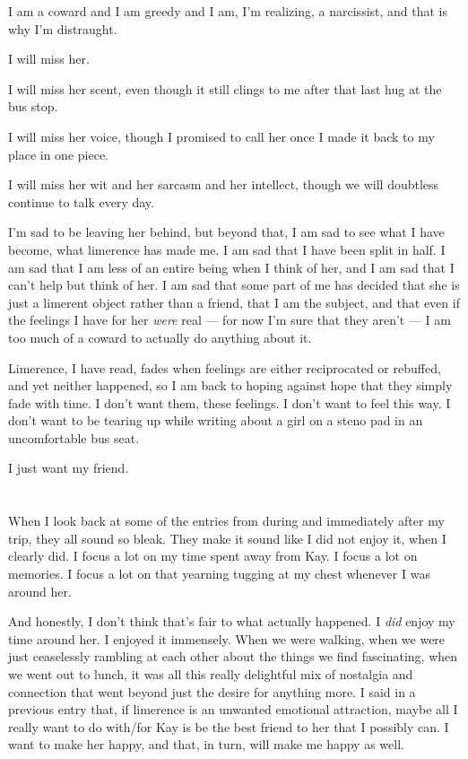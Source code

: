 I am a coward and I am greedy and I am, I'm realizing, a narcissist, and that is why I'm distraught.

I will miss her.

I will miss her scent, even though it still clings to me after that last hug at the bus stop.

I will miss her voice, though I promised to call her once I made it back to my place in one piece.

I will miss her wit and her sarcasm and her intellect, though we will doubtless continue to talk every day.

I'm sad to be leaving her behind, but beyond that, I am sad to see what I have become, what limerence has made me. I am sad that I have been split in half. I am sad that I am less of an entire being when I think of her, and I am sad that I can't help but think of her. I am sad that some part of me has decided that she is just a limerent object rather than a friend, that I am the subject, and that even if the feelings I have for her \emph{were} real --- for now I'm sure that they aren't --- I am too much of a coward to actually do anything about it.

Limerence, I have read, fades when feelings are either reciprocated or rebuffed, and yet neither happened, so I am back to hoping against hope that they simply fade with time. I don't want them, these feelings. I don't want to feel this way. I don't want to be tearing up while writing about a girl on a steno pad in an uncomfortable bus seat.

I just want my friend.

\section{}

When I look back at some of the entries from during and immediately after my trip, they all sound so bleak. They make it sound like I did not enjoy it, when I clearly did. I focus a lot on my time spent away from Kay. I focus a lot on memories. I focus a lot on that yearning tugging at my chest whenever I was around her.

And honestly, I don't think that's fair to what actually happened. I \emph{did} enjoy my time around her. I enjoyed it immensely. When we were walking, when we were just ceaselessly rambling at each other about the things we find fascinating, when we went out to lunch, it was all this really delightful mix of nostalgia and connection that went beyond just the desire for anything more. I said in a previous entry that, if limerence is an unwanted emotional attraction, maybe all I really want to do with/for Kay is be the best friend to her that I possibly can. I want to make her happy, and that, in turn, will make me happy as well.

